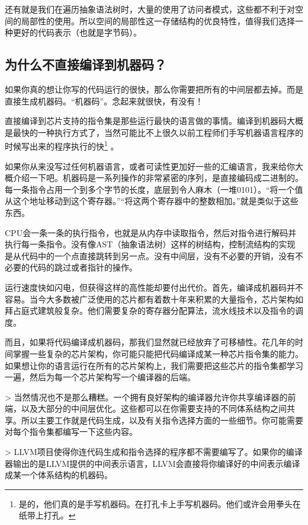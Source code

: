 \documentclass[cn,10pt,math=newtx,citestyle=gb7714-2015,bibstyle=gb7714-2015]{elegantbook}
\begin{document}
还有就是我们在遍历抽象语法树时，大量的使用了访问者模式，这些都不利于对空间的局部性的使用。所以空间的局部性这一存储结构的优良特性，值得我们选择一种更好的代码表示（也就是字节码）。

\subsection{为什么不直接编译到机器码？}

如果你真的想让你写的代码运行的很快，那么你需要把所有的中间层都去掉。而是直接生成机器码。“机器码”。念起来就很快，有没有！

直接编译到芯片支持的指令集是那些运行最快的语言做的事情。编译到机器码大概是最快的一种执行方式了，当然可能比不上很久以前工程师们手写机器语言程序的时候写出来的程序执行的快\footnote{是的，他们真的是手写机器码。在打孔卡上手写机器码。他们或许会用拳头在纸带上打孔。} 。

如果你从来没写过任何机器语言，或者可读性更加好一些的汇编语言，我来给你大概介绍一下吧。机器码是一系列操作的非常紧密的序列，是直接编码成二进制的。每一条指令占用一个到多个字节的长度，底层到令人麻木（一堆0101）。“将一个值从这个地址移动到这个寄存器。”“将这两个寄存器中的整数相加。”就是类似于这些东西。

CPU会一条一条的执行指令，也就是从内存中读取指令，然后对指令进行解码并执行每一条指令。没有像AST（抽象语法树）这样的树结构，控制流结构的实现是从代码中的一个点直接跳转到另一点。没有中间层，没有不必要的开销，没有不必要的代码的跳过或者指针的操作。

运行速度快如闪电，但获得这样的高性能却要付出代价。首先，编译成机器码并不容易。当今大多数被广泛使用的芯片都有着数十年来积累的大量指令，芯片架构如拜占庭式建筑般复杂。他们需要复杂的寄存器分配算法，流水线技术以及指令的调度。

而且，如果将代码编译成机器码，那我们显然就已经放弃了可移植性。花几年的时间掌握一些复杂的芯片架构，你可能只能把代码编译成某一种芯片指令集的能力。如果想让你的语言运行在所有的芯片架构上，我们需要把这些芯片的指令集都学习一遍，然后为每一个芯片架构写一个编译器的后端。

> 当然情况也不是那么糟糕。一个拥有良好架构的编译器允许你共享编译器的前端，以及大部分的中间层优化。这些都可以在你需要支持的不同体系结构之间共享。所以主要工作就是代码生成，以及有关指令选择方面的一些细节。你可能需要对每个指令集都编写一下这些内容。

> LLVM项目使得你连代码生成和指令选择的程序都不需要编写了。如果你的编译器输出的是LLVM提供的中间表示语言，LLVM会直接将你编译好的中间表示编译成某一个体系结构的机器码。
\end{document}
